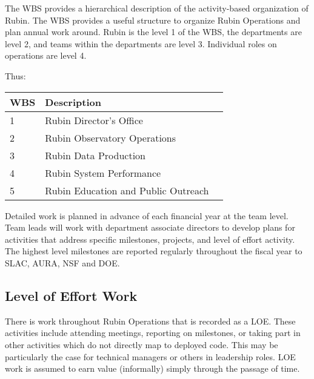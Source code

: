 The \gls{WBS} provides a hierarchical description of the activity-based organization of Rubin.
The WBS provides a useful structure to organize Rubin Operations and plan annual work around.
Rubin is the level 1 of the WBS, the departments are level 2, and teams within the departments are level 3.
Individual roles on operations are level 4.

Thus:

\begin{longtable}[]{@{}lll@{}}
\hline
\gls{WBS} & Description \tabularnewline
\hline
\endhead

1 & Rubin Director's Office  \tabularnewline
2 & Rubin Observatory Operations  \tabularnewline
3 & Rubin Data Production \tabularnewline
4 & Rubin System Performance  \tabularnewline
5 & Rubin Education and Public Outreach \tabularnewline

\hline
\end{longtable}


Detailed work is planned in advance of each financial year at the team level.
Team leads will work with department associate directors to develop plans for activities that address specific milestones, projects, and level of effort activity.
The highest level milestones are reported regularly throughout the fiscal year to SLAC, AURA, NSF and DOE.


\subsection{Level of Effort Work}
\label{sec:loe}

There is work throughout Rubin Operations that is recorded as a \gls{LOE}.
These activities include attending meetings, reporting on milestones, or taking part in other activities which do not directly map to deployed code.
This may be particularly the case for technical managers or others in leadership roles.
\gls{LOE} work is assumed to earn value (informally) simply through the passage of time.

